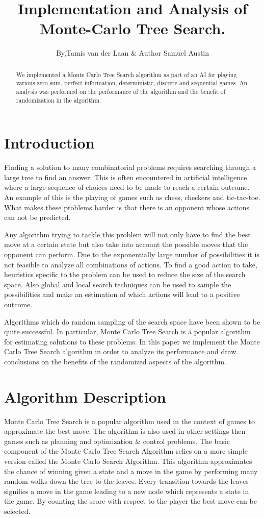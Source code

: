 \documentclass[compressed,final,notitlepage,narroweqnarray,inline,twoside,]{ieee}
\title[TITLE]{Implementation and Analysis of Monte-Carlo Tree Search.}
\author{By,Tamis van der Laan \& Author Samuel Austin }
\begin{document}
\maketitle

\begin{abstract}
We implemented a Monte Carlo Tree Search algorithm as part of an AI for playing various zero sum, perfect information, deterministic, discrete and sequential games. An analysis was performed on the performance of the algorithm and the benefit of randomization in the algorithm.
\end{abstract}

\section{Introduction}
Finding a solution to many combinatorial problems requires searching through a large tree to find an answer. This is often encountered in artificial intelligence where a large sequence of choices need to be made to reach a certain outcome. An example of this is the playing of games such as chess, checkers and tic-tac-toe. What makes these problems harder is that there is an opponent whose actions can not be predicted.

Any algorithm trying to tackle this problem will not only have to find the best move at a certain state but also take into account the possible moves that the opponent can perform. Due to the exponentially large number of possibilities it is not feasible to analyze all combinations of actions. To find a good action to take, heuristics specific to the problem can be used to reduce the size of the search space. Also global and local search techniques can be used to sample the possibilities and make an estimation of which actions will lead to a positive outcome.

Algorithms which do random sampling of the search space have been shown to be quite successful. In particular, Monte Carlo Tree Search is a popular algorithm for estimating solutions to these problems. In this paper we implement the Monte Carlo Tree Search algorithm in order to analyze its performance and draw conclusions on the benefits of the randomized aspects of the algorithm.

\section{Algorithm Description}
Monte Carlo Tree Search is a popular algorithm used in the context of games to approximate the best move.\cite{MCTS} The algorithm is also used in other settings then games such as planning and optimization \& control problems. The basic component of the Monte Carlo Tree Search Algorithm relies on a more simple version called the Monte Carlo Search Algorithm. This algorithm approximates the chance of winning given a state and a move in the game by performing many random walks down the tree to the leaves. Every transition towards the leaves signifies a move in the game leading to a new node which represents a state in the game. By counting the score with respect to the player the best move can be selected.
\end{document}
